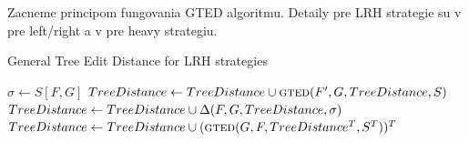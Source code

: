 Zacneme principom fungovania GTED algoritmu. Detaily pre LRH strategie su
v \citet{ZHANGSHASHA} pre left/right a v \citet{DMRW} pre heavy strategiu.

\begin{algorithm}
  \caption{General Tree Edit Distance for LRH strategies}
  \label{alg:gted}
  \begin{algorithmic}[1]
      \State $\sigma \gets S[F, G]$
          \State $TreeDistance \gets TreeDistance \cup \Call{gted}{F', G, TreeDistance, S}$
        \EndFor
        \State $TreeDistance \gets TreeDistance \cup \Call{$\Delta$}{F, G, TreeDistance, \sigma}$
      \Else
        \State $TreeDistance \gets TreeDistance \cup (\Call{gted}{G, F, TreeDistance^{T}, S^{T}})^{T}$
      \EndIf
      \State {}
    \EndProcedure
  \end{algorithmic}
\end{algorithm}

